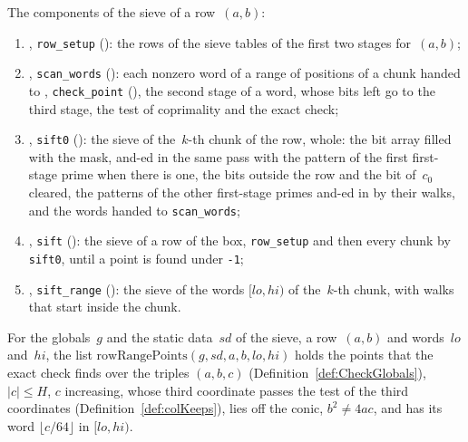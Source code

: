 \begin{definition}\label{def:sift}
  \leanok
  The components of the sieve of a row~$(a, b)$:
  \begin{enumerate}
    \item {}, \texttt{row\_setup} (): the rows
      of the sieve tables of the first two stages for~$(a, b)$;
    \item {}, \texttt{scan\_words} (): each
      nonzero word of a range of positions of a chunk handed to ,
      \texttt{check\_point} (), the second stage of a word, whose bits
      left go to the third stage, the test of coprimality and the exact check;
    \item {}, \texttt{sift0} (): the sieve of
      the~$k$-th chunk of the row, whole: the bit array filled with the mask, and-ed in the same pass
      with the pattern of the first first-stage prime when there is one, the bits outside the row and the bit of~$c_0$ cleared,
      the patterns of the other first-stage primes and-ed in by their walks, and the words handed
      to \texttt{scan\_words};
    \item {}, \texttt{sift} (): the sieve of a row
      of the box, \texttt{row\_setup} and then every chunk by \texttt{sift0}, until a point is
      found under \texttt{-1};
    \item {}, \texttt{sift\_range} (): the
      sieve of the words $[lo, hi)$ of the~$k$-th chunk, with walks that start inside the chunk.
  \end{enumerate}
\end{definition}

\begin{definition}\label{def:rowRangePoints}
  \leanok
  For the globals~$g$ and the static data~$sd$ of the sieve, a row~$(a, b)$ and words~$lo$
  and~$hi$, the list $\mathrm{rowRangePoints}(g, sd, a, b, lo, hi)$ holds the points that the exact
  check finds over the triples $(a, b, c)$ (Definition~\ref{def:CheckGlobals}), $|c| \le H$,
  $c$ increasing, whose third coordinate passes the test of the third coordinates
   (Definition~\ref{def:colKeeps}), lies off the conic, $b^2 \ne 4 a c$,
  and has its word $\lfloor c/64 \rfloor$ in $[lo, hi)$.
\end{definition}

